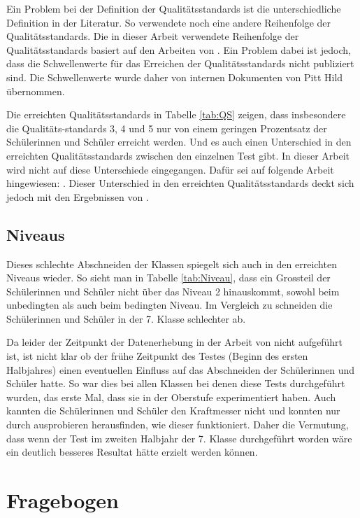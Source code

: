 Ein Problem bei der Definition der Qualitätsstandards ist die unterschiedliche Definition in der Literatur. So verwendete \citet{Gut2013a} noch eine andere Reihenfolge der Qualitätsstandards. Die in dieser Arbeit verwendete Reihenfolge der Qualitätsstandards basiert auf den Arbeiten von \citet{Metzger2013, Gut2013a}. Ein Problem dabei ist jedoch, dass die Schwellenwerte für das Erreichen der Qualitätsstandards nicht publiziert sind. Die Schwellenwerte wurde daher von internen Dokumenten von Pitt Hild übernommen.

Die erreichten Qualitätsstandards in Tabelle \ref{tab:QS} zeigen, dass insbesondere die Qualitäts-standards 3, 4 und 5 nur von einem geringen Prozentsatz der Schülerinnen und Schüler erreicht werden. Und es auch einen Unterschied in den erreichten Qualitätsstandards zwischen den einzelnen Test gibt. In dieser Arbeit wird nicht auf diese Unterschiede eingegangen. Dafür sei auf folgende Arbeit hingewiesen: \citet{Sichau2015}. Dieser Unterschied in den erreichten Qualitätsstandards deckt sich jedoch mit den Ergebnissen von \citet{Metzger2013}.

\subsection{Niveaus}

Dieses schlechte Abschneiden der Klassen spiegelt sich auch in den erreichten Niveaus wieder. So sieht man in Tabelle \ref{tab:Niveau}, dass ein Grossteil der Schülerinnen und Schüler nicht über das Niveau 2 hinauskommt, sowohl beim unbedingten als auch beim bedingten Niveau. Im Vergleich zu \citet{Metzger2013} schneiden die Schülerinnen und Schüler in der 7. Klasse schlechter ab. 

Da leider der Zeitpunkt der Datenerhebung in der Arbeit von \citet{Metzger2013} nicht aufgeführt ist, ist nicht klar ob der frühe Zeitpunkt des Testes (Beginn des ersten Halbjahres) einen eventuellen Einfluss auf das Abschneiden der Schülerinnen und Schüler hatte. So war dies bei allen Klassen bei denen diese Tests durchgeführt wurden, das erste Mal, dass sie in der Oberstufe experimentiert haben. Auch kannten die Schülerinnen und Schüler den Kraftmesser nicht und konnten nur durch ausprobieren herausfinden, wie dieser funktioniert. Daher die Vermutung, dass wenn der Test im zweiten Halbjahr der 7. Klasse durchgeführt worden wäre ein deutlich besseres Resultat hätte erzielt werden können.



\section{Fragebogen}

